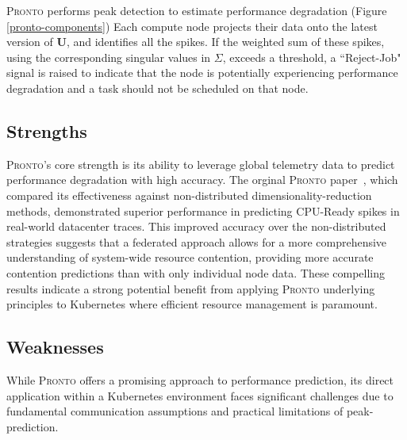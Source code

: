 \textsc{Pronto} performs peak detection to estimate performance degradation
(Figure \ref{pronto-components}) Each compute node projects their data onto the
latest version of $\textbf{U}$, and identifies all the spikes. If the weighted
sum of these spikes, using the corresponding singular values in $\Sigma$,
exceeds a threshold, a ``Reject-Job" signal is raised to indicate that the node
is potentially experiencing performance degradation and a task should not be
scheduled on that node.

\subsection{Strengths}
\textsc{Pronto}'s core strength is its ability to leverage global telemetry data
to predict performance degradation with high accuracy. The orginal
\textsc{Pronto} paper~\cite{grammenos_pronto_2021}, which compared its
effectiveness against non-distributed dimensionality-reduction methods,
demonstrated superior performance in predicting CPU-Ready spikes in real-world
datacenter traces. This improved accuracy over the non-distributed
strategies suggests that a federated approach allows for a more comprehensive
understanding of system-wide resource contention, providing more accurate
contention predictions than with only individual node data. These compelling
results indicate a strong potential benefit from applying \textsc{Pronto}
underlying principles to Kubernetes where efficient resource management is
paramount.

\subsection{Weaknesses}
\label{sec:intro-weakness}
While \textsc{Pronto} offers a promising approach to performance prediction, its
direct application within a Kubernetes environment faces significant challenges
due to fundamental communication assumptions and practical limitations of
peak-prediction.

